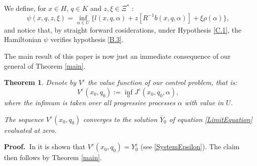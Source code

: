 \documentclass[reqno,a4paper,11 pt]{article}
\def \e {\varepsilon}
\newtheorem{theorem}{Theorem}[section]
\newtheorem{hypothesis}[theorem]{Hypothesis}
\newtheorem{remark}[theorem]{Remark}
\numberwithin{equation}{section}
\def\Dim{\noindent\hbox{{\bf Proof.}$\;\; $}}          %
\begin{document}
We define, for $x\in H$, $q\in K$ and
$z, \xi \in \Xi^*$ :
\begin{equation}
\label{Hamiltonian}
\psi(x,q,z,\xi) = \inf_{\alpha \in U} \{l(x,q,\alpha)+ z[R^{-1}b(x,q,\alpha)] + \xi \rho(\alpha) \},  \end{equation}
and notice that, by straight forward cosiderations, under  Hypothesis \ref{C.1}, the Hamiltonian $\psi$ verifies hypothesis \ref{B.3}.




The main result of this paper is now just an immediate consequence of our general of Theorem \ref{main}.
\begin{theorem}\label{main_controllo} Denote by $V^{\e}$ the value function of our control problem, that is:
$$V^\e(x_0,q_0):= \inf_{\alpha}J^\e(x_0,q_0,\alpha),$$
where the infimum is taken over all progressive processes $\alpha$ with value in $U$. 

The sequence $V^\e(x_0,q_0)$ converges to the solution $\bar{Y}_0$ of equation \eqref{LimitEquation} evaluated at zero.
\end{theorem}

\Dim In \cite{FuHuGenGrad} it is shown that $V^\e(x_0,q_0)=Y^\e_0$ (see \eqref{SystemEpsilon}). The claim then follows by Theorem \ref{main}.



\end{document}
